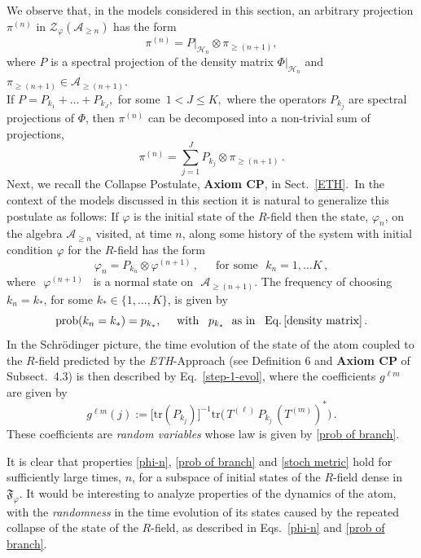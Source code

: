\documentclass[12pt]{article}
\begin{document}
{We observe that, in the models considered in this section, an arbitrary projection $\pi^{(n)}$ in
$\mathcal{Z}_{\varphi}(\mathcal{A}_{\geq n})$ has the form
$$\pi^{(n)} = P\vert_{\mathcal{H}_n} \otimes \pi_{\geq(n+1)},$$
where $P$ is a spectral projection of the density matrix $\Phi\vert_{\mathcal{H}_n}$ and $\pi_{\geq (n+1)} \in \mathcal{A}_{\geq(n+1)}$.\\
If $P= P_{k_1}+\dots + P_{k_J},$ for some \,$1< J\leq K,$ where the operators $P_{k_j}$ are spectral projections of
$\Phi$, then $\pi^{(n)}$ can be decomposed into a non-trivial sum of projections,
$$\pi^{(n)}= \sum_{j=1}^{J} P_{k_j}\otimes \pi_{\geq(n+1)}\,.$$
Next, we recall the Collapse Postulate, {\bf{Axiom CP}}, in Sect.~\ref{ETH}.~In the context of the models discussed
in this section it is natural to generalize this postulate as follows:
If $\varphi$ is the initial state of the $R$-field then the state, $\varphi_n$, on the algebra $\mathcal{A}_{\geq n}$ visited,
at time $n$, along some history of the system with initial condition $\varphi$ for the $R$-field has the form
\begin{equation}\label{phi-n}
\varphi_{n} = P_{k_n} \otimes \varphi^{(n+1)}\,, \quad \, \text{ for some   }\,\, k_n = 1,\dots K\,,
\end{equation}
where\,\, $\varphi^{(n+1)} $\,\,\ is a normal state on\,\, $\mathcal{A}_{\geq(n+1)}$. The frequency of choosing $k_n=k_{*}$,
for some $k_{*}\in \{1,\dots, K\}$, is given by
\begin{equation}\label{prob of branch}
\text{prob}(k_n=k_{*}) = p_{k_{*}}, \quad \text{ with  }\,\, \,p_{k_{*}} \,\, \text{ as in }\,\, \, \text{Eq.}\,\eqref{density matrix}\,.
\end{equation}
In the Schr\"odinger picture, the time evolution of the state of the atom coupled to the $R$-field predicted by the
\textit{ETH}-Approach (see Definition 6 and {\bf{Axiom CP}} of Subsect.~4.3) is then described by Eq.~\eqref{step-1-evol},
where the coefficients $g^{\ell m}$ are given by
\begin{equation}\label{stoch metric}
g^{\ell m}(j):= \big[\text{tr}(P_{k_j})\big]^{-1} \text{tr}\big(\, T^{(\ell)}\,P_{k_j}\, (T^{(m)})^{*} \big)\,.
\end{equation}
These coefficients are \textit{random variables} whose law is given by \eqref{prob of branch}.

It is clear that properties \eqref{phi-n}, \eqref{prob of branch} and \eqref{stoch metric} hold for sufficiently large times, $n$, for a subspace of initial states of the $R$-field dense in $\mathfrak{F}_{\varphi}$.
It would be interesting to analyze properties of the dynamics of the atom, with the \textit{randomness} in the time evolution of its states caused by the repeated collapse of the state of the $R$-field, as described in Eqs.~\eqref{phi-n} and
\eqref{prob of branch}.

}
\end{document}
